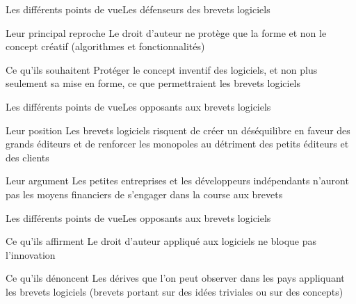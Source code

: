 \documentclass{beamer}
\begin{document}
\begin{frame}{Les différents points de vue}{Les défenseurs des brevets logiciels}
    \begin{block}{Leur principal reproche}
        Le droit d'auteur ne protège que la forme et non le concept créatif
        (algorithmes et fonctionnalités)
    \end{block}
    \begin{block}{Ce qu'ils souhaitent}
        Protéger le concept inventif des logiciels, et non plus seulement sa
        mise en forme, ce que permettraient les brevets logiciels
    \end{block}
\end{frame}

\begin{frame}{Les différents points de vue}{Les opposants aux brevets logiciels}
    \begin{block}{Leur position}
        Les brevets logiciels risquent de créer un déséquilibre en faveur
        des grands éditeurs et de renforcer les monopoles au détriment des
        petits éditeurs et des clients
    \end{block}
    \begin{block}{Leur argument}
        Les petites entreprises et les développeurs indépendants n'auront
        pas les moyens financiers de s'engager dans la course aux brevets
    \end{block}
\end{frame}

\begin{frame}{Les différents points de vue}{Les opposants aux brevets logiciels}
    \begin{block}{Ce qu'ils affirment}
        Le droit d'auteur appliqué aux logiciels ne bloque pas l'innovation
    \end{block}
    \begin{block}{Ce qu'ils dénoncent}
        Les dérives que l'on peut observer dans les pays appliquant les
        brevets logiciels (brevets portant sur des idées triviales ou sur
        des concepts)
    \end{block}
\end{frame}
\end{document}
